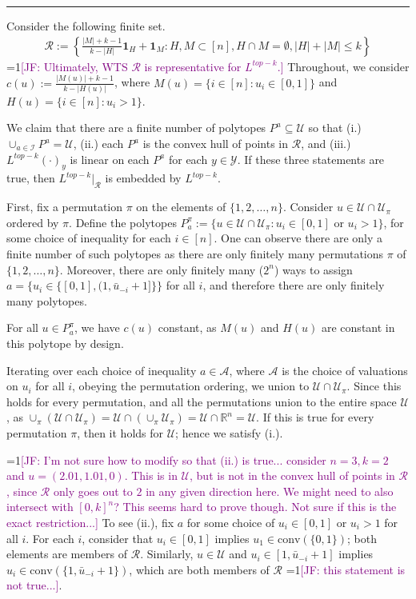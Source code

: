 \documentclass[12pt]{article}
\newcommand{\Comments}{1}
\newcommand{\mynote}[2]{\ifnum\Comments=1\textcolor{#1}{#2}\fi}
\newcommand{\jessie}[1]{\mynote{purple}{[JF: #1]}}
\newcommand{\reals}{\mathbb{R}}
\newcommand{\I}{\mathcal{I}}
\newcommand{\R}{\mathcal{R}}
\newcommand{\U}{\mathcal{U}}
\newcommand{\Y}{\mathcal{Y}}
\newcommand{\conv}{\mathrm{conv}}
\begin{document}
\bigskip
\hrule
\bigskip

Consider the following finite set.
\begin{align*}
\R := \left\{ \frac{|M| + k -1}{k - |H|} \mathbf{1}_H + \mathbf{1}_M : H, M \subset [n], H\cap M = \emptyset, |H| + |M| \leq k \right\}
\end{align*}
\jessie{Ultimately, WTS $\R$ is representative for $L^{top-k}$.}
Throughout, we consider $c(u) := \frac{|M(u)| + k -1}{k - |H(u)|}$, where $M(u) = \{i \in [n] : u_i \in [0,1] \}$ and $H(u) = \{i \in [n] : u_i > 1\}$.

We claim that there are a finite number of polytopes $P^{a} \subseteq \U$ so that (i.) $\cup_{a \in \I} P^{a} = \U$, (ii.) each $P^{a}$ is the convex hull of points in $\R$, and (iii.) $L^{top-k}(\cdot)_y$ is linear on each $P^{a}$ for each $y \in \Y$.
If these three statements are true, then $L^{top-k}|_\R$ is embedded by $L^{top-k}$.

First, fix a permutation $\pi$ on the elements of $\{1,2,\ldots, n\}$.
Consider $u \in \U \cap \U_\pi$ ordered by $\pi$.
Define the polytopes $P^\pi_a := \{u \in \U\cap \U_\pi : u_i \in [0,1] \text{ or } u_i > 1\}$, for some choice of inequality for each $i \in [n]$.
One can observe there are only a finite number of such polytopes as there are only finitely many permutations $\pi$ of $\{1,2,\ldots, n\}$.
Moreover, there are only finitely many ($2^n$) ways to assign $a = \{u_i \in \{[0,1], (1, \bar u_{-i} + 1]\} \}$ for all $i$, and therefore there are only finitely many polytopes.

For all $u \in P^\pi_a$, we have $c(u)$ constant, as $M(u)$ and $H(u)$ are constant in this polytope by design.


Iterating over each choice of inequality $a \in \mathcal{A}$, where $\mathcal{A}$ is the choice of valuations on $u_i$ for all $i$, obeying the permutation ordering, we union to $\U \cap \U_\pi$.  
Since this holds for every permutation, and all the permutations union to the entire space $\U$, as $\cup_\pi(\U \cap \U_\pi) = \U \cap (\cup_\pi \U_\pi) = \U \cap \reals^n = \U$.  
If this is true for every permutation $\pi$, then it holds for $\U$; hence we satisfy (i.).

\jessie{I'm not sure how to modify so that (ii.) is true... consider $n=3, k=2$ and $u = (2.01, 1.01, 0)$.  This is in $\U$, but is not in the convex hull of points in $\R$, since $\R$ only goes out to $2$ in any given direction here.  We might need to also intersect with $[0,k]^n$?  This seems hard to prove though.  Not sure if this is the exact restriction...}
To see (ii.), fix $a$ for some choice of $u_i \in [0,1]$ or $u_i >1$ for all $i$.
For each $i$, consider that $u_i \in [0,1]$ implies $u_1 \in \conv(\{0,1\})$; both elements are members of $\R$.
Similarly, $u \in \U$ and $u_i \in [1,\bar u_{-i}+1]$ implies  $u_i \in \conv(\{1, \bar u_{-i} + 1\})$, which are both members of $\R$ \jessie{this statement is not true...}.
\end{document}
